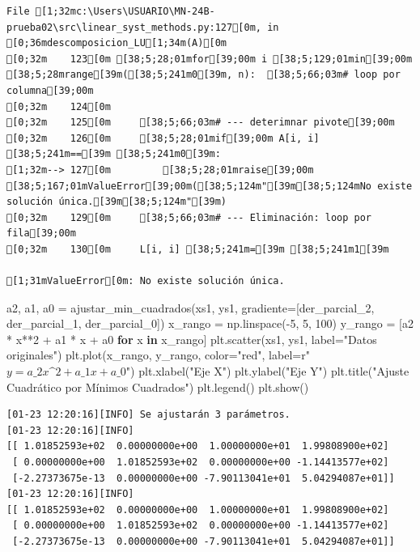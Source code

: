 \documentclass[
  letterpaper,
  DIV=11,
  numbers=noendperiod]{scrartcl}
\newenvironment{Shaded}{\begin{snugshade}}{\end{snugshade}}
\newcommand{\ControlFlowTok}[1]{\textcolor[rgb]{0.00,0.23,0.31}{\textbf{#1}}}
\newcommand{\DecValTok}[1]{\textcolor[rgb]{0.68,0.00,0.00}{#1}}
\newcommand{\KeywordTok}[1]{\textcolor[rgb]{0.00,0.23,0.31}{\textbf{#1}}}
\newcommand{\NormalTok}[1]{\textcolor[rgb]{0.00,0.23,0.31}{#1}}
\newcommand{\OperatorTok}[1]{\textcolor[rgb]{0.37,0.37,0.37}{#1}}
\newcommand{\StringTok}[1]{\textcolor[rgb]{0.13,0.47,0.30}{#1}}
\newcommand{\VerbatimStringTok}[1]{\textcolor[rgb]{0.13,0.47,0.30}{#1}}
\begin{document}
\begin{verbatim}
File [1;32mc:\Users\USUARIO\MN-24B-prueba02\src\linear_syst_methods.py:127[0m, in [0;36mdescomposicion_LU[1;34m(A)[0m
[0;32m    123[0m [38;5;28;01mfor[39;00m i [38;5;129;01min[39;00m [38;5;28mrange[39m([38;5;241m0[39m, n):  [38;5;66;03m# loop por columna[39;00m
[0;32m    124[0m 
[0;32m    125[0m     [38;5;66;03m# --- deterimnar pivote[39;00m
[0;32m    126[0m     [38;5;28;01mif[39;00m A[i, i] [38;5;241m==[39m [38;5;241m0[39m:
[1;32m--> 127[0m         [38;5;28;01mraise[39;00m [38;5;167;01mValueError[39;00m([38;5;124m"[39m[38;5;124mNo existe solución única.[39m[38;5;124m"[39m)
[0;32m    129[0m     [38;5;66;03m# --- Eliminación: loop por fila[39;00m
[0;32m    130[0m     L[i, i] [38;5;241m=[39m [38;5;241m1[39m

[1;31mValueError[0m: No existe solución única.
\end{verbatim}

\begin{Shaded}
\begin{Highlighting}[]
\NormalTok{a2, a1, a0 }\OperatorTok{=}\NormalTok{ ajustar\_min\_cuadrados(xs1, ys1, gradiente}\OperatorTok{=}\NormalTok{[der\_parcial\_2, der\_parcial\_1, der\_parcial\_0])}
\NormalTok{x\_rango }\OperatorTok{=}\NormalTok{ np.linspace(}\OperatorTok{{-}}\DecValTok{5}\NormalTok{, }\DecValTok{5}\NormalTok{, }\DecValTok{100}\NormalTok{)}
\NormalTok{y\_rango }\OperatorTok{=}\NormalTok{ [a2 }\OperatorTok{*}\NormalTok{ x}\OperatorTok{**}\DecValTok{2} \OperatorTok{+}\NormalTok{ a1 }\OperatorTok{*}\NormalTok{ x }\OperatorTok{+}\NormalTok{ a0 }\ControlFlowTok{for}\NormalTok{ x }\KeywordTok{in}\NormalTok{ x\_rango]}
\NormalTok{plt.scatter(xs1, ys1, label}\OperatorTok{=}\StringTok{"Datos originales"}\NormalTok{)}
\NormalTok{plt.plot(x\_rango, y\_rango, color}\OperatorTok{=}\StringTok{"red"}\NormalTok{, label}\OperatorTok{=}\VerbatimStringTok{r"$y = a\_2 x\^{}2 + a\_1 x + a\_0$"}\NormalTok{)}
\NormalTok{plt.xlabel(}\StringTok{"Eje X"}\NormalTok{)}
\NormalTok{plt.ylabel(}\StringTok{"Eje Y"}\NormalTok{)}
\NormalTok{plt.title(}\StringTok{"Ajuste Cuadrático por Mínimos Cuadrados"}\NormalTok{)}
\NormalTok{plt.legend()}
\NormalTok{plt.show()}
\end{Highlighting}
\end{Shaded}

\begin{verbatim}
[01-23 12:20:16][INFO] Se ajustarán 3 parámetros.
[01-23 12:20:16][INFO] 
[[ 1.01852593e+02  0.00000000e+00  1.00000000e+01  1.99808900e+02]
 [ 0.00000000e+00  1.01852593e+02  0.00000000e+00 -1.14413577e+02]
 [-2.27373675e-13  0.00000000e+00 -7.90113041e+01  5.04294087e+01]]
[01-23 12:20:16][INFO] 
[[ 1.01852593e+02  0.00000000e+00  1.00000000e+01  1.99808900e+02]
 [ 0.00000000e+00  1.01852593e+02  0.00000000e+00 -1.14413577e+02]
 [-2.27373675e-13  0.00000000e+00 -7.90113041e+01  5.04294087e+01]]
\end{verbatim}
\end{document}
